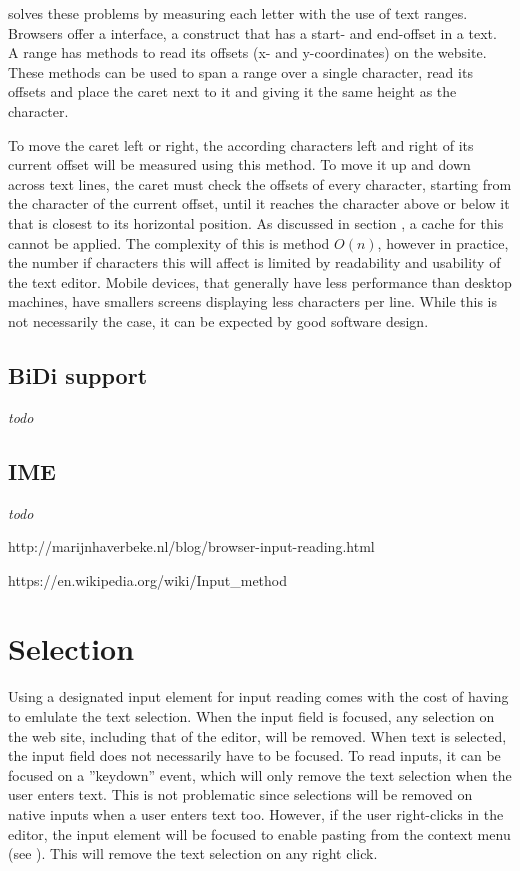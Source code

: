  solves these problems by measuring each letter with the use of text ranges. Browsers offer a  interface, a construct that has a start- and end-offset in a text. A range has methods to read its offsets (x- and y-coordinates) on the website. These methods can be used to span a range over a single character, read its offsets and place the caret next to it and giving it the same height as the character.

To move the caret left or right, the according characters left and right of its current offset will be measured using this method. To move it up and down across text lines, the caret must check the offsets of every character, starting from the character of the current offset, until it reaches the character above or below it that is closest to its horizontal position. As discussed in section , a cache for this cannot be applied. The complexity of this is method $O(n)$, however in practice, the number if characters this will affect is limited by readability and usability of the text editor. Mobile devices, that generally have less performance than desktop machines, have smallers screens displaying less characters per line. While this is not necessarily the case, it can be expected by good software design.

\subsection{BiDi support}

\textit{todo}

\subsection{IME} 

\textit{todo}

http://marijnhaverbeke.nl/blog/browser-input-reading.html 

https://en.wikipedia.org/wiki/Input\_method

\section{Selection}

Using a designated input element for input reading comes with the cost of having to emlulate the text selection. When the input field is focused, any selection on the web site, including that of the editor, will be removed. When text is selected, the input field does not necessarily have to be focused. To read inputs, it can be focused on a ''keydown'' event, which will only remove the text selection when the user enters text. This is not problematic since selections will be removed on native inputs when a user enters text too. However, if the user right-clicks in the editor, the input element will be focused to enable pasting from the context menu (see ). This will remove the text selection on any right click.


